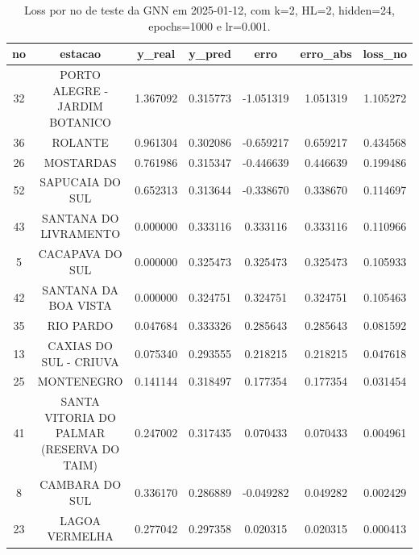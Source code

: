 \begin{table}[h]
\centering
\caption{Loss por no de teste da GNN em 2025-01-12, com k=2, HL=2, hidden=24, epochs=1000 e lr=0.001.}
\label{tab:gnn_loss_k2_hl2_h24_e1000_d20250112}
\begin{tabular}{ccccccc}
\toprule
no & estacao & y\_real & y\_pred & erro & erro\_abs & loss\_no \\
\midrule
32 & PORTO ALEGRE - JARDIM BOTANICO & 1.367092 & 0.315773 & -1.051319 & 1.051319 & 1.105272 \\
36 & ROLANTE & 0.961304 & 0.302086 & -0.659217 & 0.659217 & 0.434568 \\
26 & MOSTARDAS & 0.761986 & 0.315347 & -0.446639 & 0.446639 & 0.199486 \\
52 & SAPUCAIA DO SUL & 0.652313 & 0.313644 & -0.338670 & 0.338670 & 0.114697 \\
43 & SANTANA DO LIVRAMENTO & 0.000000 & 0.333116 & 0.333116 & 0.333116 & 0.110966 \\
5 & CACAPAVA DO SUL & 0.000000 & 0.325473 & 0.325473 & 0.325473 & 0.105933 \\
42 & SANTANA DA BOA VISTA & 0.000000 & 0.324751 & 0.324751 & 0.324751 & 0.105463 \\
35 & RIO PARDO & 0.047684 & 0.333326 & 0.285643 & 0.285643 & 0.081592 \\
13 & CAXIAS DO SUL - CRIUVA & 0.075340 & 0.293555 & 0.218215 & 0.218215 & 0.047618 \\
25 & MONTENEGRO & 0.141144 & 0.318497 & 0.177354 & 0.177354 & 0.031454 \\
41 & SANTA VITORIA DO PALMAR (RESERVA DO TAIM) & 0.247002 & 0.317435 & 0.070433 & 0.070433 & 0.004961 \\
8 & CAMBARA DO SUL & 0.336170 & 0.286889 & -0.049282 & 0.049282 & 0.002429 \\
23 & LAGOA VERMELHA & 0.277042 & 0.297358 & 0.020315 & 0.020315 & 0.000413 \\
\bottomrule
\end{tabular}
\end{table}
